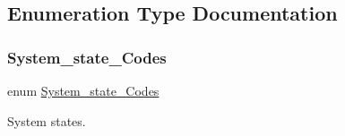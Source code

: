\subsection{Enumeration Type Documentation}
\mbox{\label{group__RTEMSScoreSysState_ga959824776c35a999ecd2720fde987d72}} 
\subsubsection{\texorpdfstring{System\_state\_Codes}{System\_state\_Codes}}
{\footnotesize\ttfamily enum \mbox{\hyperlink{group__RTEMSScoreSysState_ga959824776c35a999ecd2720fde987d72}{System\+\_\+state\+\_\+\+Codes}}}



System states. 


